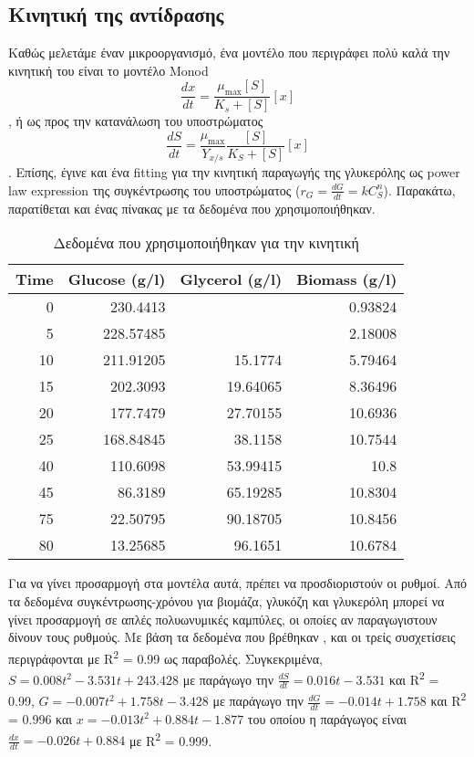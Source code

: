 \documentclass[11pt]{article}
\begin{document}
\subsection{Κινητική της αντίδρασης}
\label{sec:orge6c3e72}
Καθώς μελετάμε έναν μικροοργανισμό, ένα μοντέλο που περιγράφει πολύ καλά την κινητική του είναι το μοντέλο Monod \[ \frac{dx}{dt} = \frac{μ_{\max }[S]}{K_s + [S]}[x] \] , ή ως προς την κατανάλωση του υποστρώματος \[ \frac{dS}{dt} = \frac{μ_{\max }}{Y_{x / s}} \frac{[S]}{K_S+[S]} [x] \]. Επίσης, έγινε και ένα fitting για την κινητική παραγωγής της γλυκερόλης ως power law expression της συγκέντρωσης του υποστρώματος (\(r_G = \frac{dG}{dt} = k C_S^n\)). Παρακάτω, παρατίθεται και ένας πίνακας με τα δεδομένα που χρησιμοποιήθηκαν.

\begin{table}[htbp]
\caption{Δεδομένα που χρησιμοποιήθηκαν για την κινητική \cite{jinByproductFormationNovel2003}}
\centering
\begin{tabular}{rrrr}
Time & Glucose (g/l) & Glycerol (g/l) & Biomass (g/l)\\
\hline
0 & 230.4413 &  & 0.93824\\
5 & 228.57485 &  & 2.18008\\
10 & 211.91205 & 15.1774 & 5.79464\\
15 & 202.3093 & 19.64065 & 8.36496\\
20 & 177.7479 & 27.70155 & 10.6936\\
25 & 168.84845 & 38.1158 & 10.7544\\
40 & 110.6098 & 53.99415 & 10.8\\
45 & 86.3189 & 65.19285 & 10.8304\\
75 & 22.50795 & 90.18705 & 10.8456\\
80 & 13.25685 & 96.1651 & 10.6784\\
\end{tabular}
\end{table}


Για να γίνει προσαρμογή στα μοντέλα αυτά, πρέπει να προσδιοριστούν οι ρυθμοί. Από τα δεδομένα συγκέντρωσης-χρόνου για βιομάζα, γλυκόζη και γλυκερόλη μπορεί να γίνει προσαρμογή σε απλές πολυωνυμικές καμπύλες, οι οποίες αν παραγωγιστουν δίνουν τους ρυθμούς. Με βάση τα δεδομένα που βρέθηκαν \cite{jinByproductFormationNovel2003}, και οι τρείς συσχετίσεις περιγράφονται με R\textsuperscript{2} = 0.99 ως παραβολές. Συγκεκριμένα, \(S = 0.008t^2 - 3.531t + 243.428\) με παράγωγο την \(\frac{dS}{dt} = 0.016t - 3.531\) και R\textsuperscript{2} = 0.99, \(G = -0.007t^2 + 1.758t - 3.428\) με παράγωγο την \(\frac{dG}{dt} = -0.014t + 1.758\) και R\textsuperscript{2} = 0.996 και \(x = -0.013t^2 + 0.884t - 1.877\) του οποίου η παράγωγος είναι \(\frac{dx}{dt} = -0.026t+0.884\) με R\textsuperscript{2} = 0.999.
\end{document}
